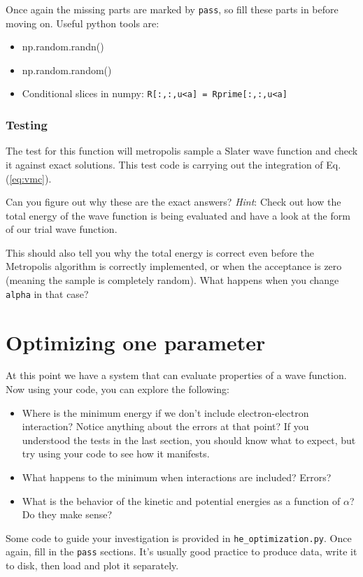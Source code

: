 \documentclass[12pt]{article}
\begin{document}
Once again the missing parts are marked by \verb|pass|, so fill these parts in before moving on. 
Useful python tools are:
\begin{itemize}
\item np.random.randn()
\item np.random.random()
\item Conditional slices in numpy: \verb|R[:,:,u<a] = Rprime[:,:,u<a]|
\end{itemize}

\subsubsection{Testing}

The test for this function will metropolis sample a Slater wave function and check it against exact solutions. 
This test code is carrying out the integration of Eq. (\ref{eq:vmc}).

Can you figure out why these are the exact answers?
\textit{Hint}: Check out how the total energy of the wave function is being evaluated and have a look at the form of our trial wave function. 

This should also tell you why the total energy is correct even before the Metropolis algorithm is correctly implemented, or when the acceptance is zero (meaning the sample is completely random).
What happens when you change \verb|alpha| in that case?

\section{Optimizing one parameter}

At this point we have a system that can evaluate properties of a wave function.
Now using your code, you can explore the following:
\begin{itemize}
\item Where is the minimum energy if we don't include electron-electron interaction? Notice anything about the errors at that point?
  If you understood the tests in the last section, you should know what to expect, but try using your code to see how it manifests.
\item What happens to the minimum when interactions are included? Errors?
\item What is the behavior of the kinetic and potential energies as a function of $\alpha$? Do they make sense?	
\end{itemize}

Some code to guide your investigation is provided in \verb|he_optimization.py|. 
Once again, fill in the \verb|pass| sections.
It's usually good practice to produce data, write it to disk, then load and plot it separately. 
\end{document}
